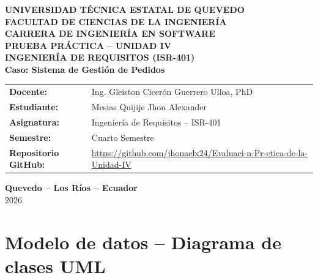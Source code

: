 \documentclass[11pt,a4paper]{article}
\begin{document}
\begin{titlepage}
\begin{center}
\vspace*{1.5cm}

{\Large\bfseries UNIVERSIDAD TÉCNICA ESTATAL DE QUEVEDO}\\[0.3cm]
{\large\bfseries FACULTAD DE CIENCIAS DE LA INGENIERÍA}\\[0.2cm]
{\large\bfseries CARRERA DE INGENIERÍA EN SOFTWARE}\\[2cm]

{\LARGE\bfseries PRUEBA PRÁCTICA -- UNIDAD IV}\\[0.4cm]
{\Large\bfseries INGENIERÍA DE REQUISITOS (ISR-401)}\\[0.4cm]
{\large\bfseries Caso: Sistema de Gestión de Pedidos}\\[2cm]

\begin{tabular}{lp{9cm}}
\textbf{Docente:} & Ing. Gleiston Cicerón Guerrero Ulloa, PhD \\[0.3cm]
\textbf{Estudiante:} & Mesias Quijije Jhon Alexander \\[0.3cm]
\textbf{Asignatura:} & Ingeniería de Requisitos -- ISR-401 \\[0.3cm]
\textbf{Semestre:} & Cuarto Semestre \\[0.3cm]
\textbf{Repositorio GitHub:} & \small\url{https://github.com/jhonaelx24/Evaluaci-n-Pr-ctica-de-la-Unidad-IV} \\
\end{tabular}

\vfill

\vspace{1cm}
{\large\bfseries Quevedo -- Los Ríos -- Ecuador}\\
{\large 2026}

\end{center}
\end{titlepage}

\tableofcontents
\newpage

\section{Modelo de datos -- Diagrama de clases UML}
\end{document}
